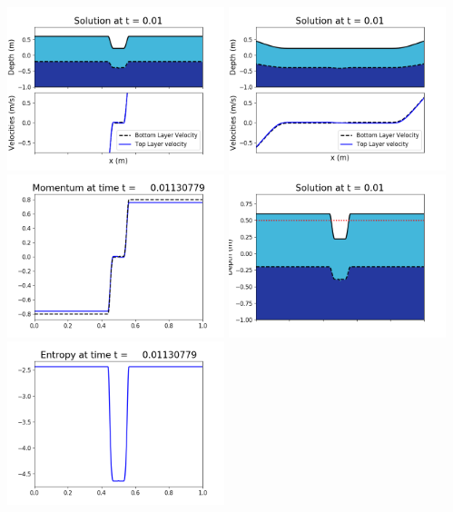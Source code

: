 \documentclass[11pt]{article}
\begin{document}
\vskip 10pt 
\includegraphics[width=0.475\textwidth]{frame0032fig1001.png}
\includegraphics[width=0.475\textwidth]{frame0032fig1002.png}
\vskip 10pt 
\includegraphics[width=0.475\textwidth]{frame0032fig1003.png}
\includegraphics[width=0.475\textwidth]{frame0032fig1006.png}
\vskip 10pt 
\includegraphics[width=0.475\textwidth]{frame0032fig1007.png}
\end{document}
